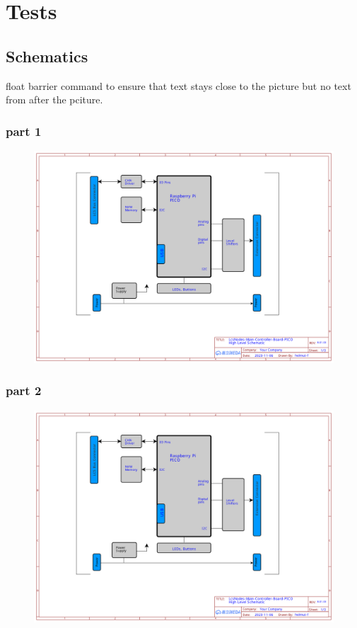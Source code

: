 \chapter{Tests}

\section{Schematics}

float barrier command to ensure that text stays close to the picture but no text from after the pciture.

\subsection{part 1}

\begin{figure}[ht]
    \centering
    \includegraphics[page=1, width=\textwidth]{./schematics/Schematic_LcsNodes-Main-Controller-Board-B.01.00.pdf}
\end{figure}

\FloatBarrier

\subsection{part 2}
\begin{figure}[ht]
    \centering
    \includegraphics[page=2, width=\textwidth]{./schematics/Schematic_LcsNodes-Main-Controller-Board-B.01.00.pdf}
\end{figure}

